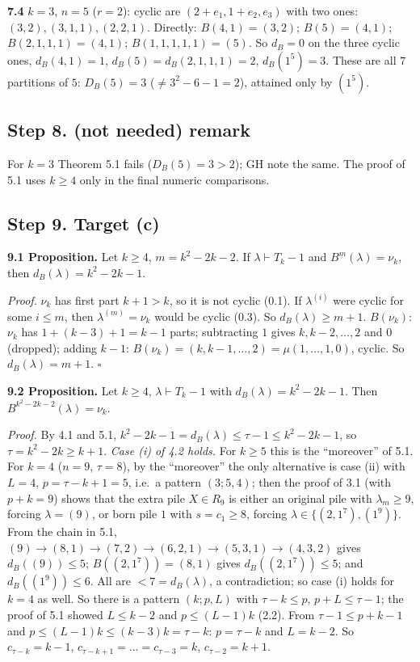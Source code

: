 \documentclass[11pt]{article}
\begin{document}
\textbf{7.4} $k=3$, $n=5$ ($r=2$): cyclic are $(2+e_1,1+e_2,e_3)$ with two ones: $(3,2),(3,1,1),(2,2,1)$. Directly: $B(4,1)=(3,2)$; $B(5)=(4,1)$; $B(2,1,1,1)=(4,1)$; $B(1,1,1,1,1)=(5)$. So $d_B=0$ on the three cyclic ones, $d_B(4,1)=1$, $d_B(5)=d_B(2,1,1,1)=2$, $d_B(1^5)=3$. These are all $7$ partitions of $5$: $D_B(5)=3$ ($\ne 3^2-6-1=2$), attained only by $(1^5)$.

\subsection*{Step 8. (not needed) remark}
For $k=3$ Theorem 5.1 fails ($D_B(5)=3>2$); GH note the same. The proof of 5.1 uses $k\ge4$ only in the final numeric comparisons.

\subsection*{Step 9. Target (c)}

\textbf{9.1 Proposition.} Let $k\ge4$, $m=k^2-2k-2$. If $\lambda\vdash T_k-1$ and $B^m(\lambda)=\nu_k$, then $d_B(\lambda)=k^2-2k-1$.

\emph{Proof.} $\nu_k$ has first part $k+1>k$, so it is not cyclic (0.1). If $\lambda^{(i)}$ were cyclic for some $i\le m$, then $\lambda^{(m)}=\nu_k$ would be cyclic (0.3). So $d_B(\lambda)\ge m+1$. $B(\nu_k)$: $\nu_k$ has $1+(k-3)+1=k-1$ parts; subtracting $1$ gives $k,k-2,\dots,2$ and $0$ (dropped); adding $k-1$: $B(\nu_k)=(k,k-1,\dots,2)=\mu(1,\dots,1,0)$, cyclic. So $d_B(\lambda)=m+1$. $\square$

\textbf{9.2 Proposition.} Let $k\ge4$, $\lambda\vdash T_k-1$ with $d_B(\lambda)=k^2-2k-1$. Then $B^{k^2-2k-2}(\lambda)=\nu_k$.

\emph{Proof.} By 4.1 and 5.1, $k^2-2k-1=d_B(\lambda)\le\tau-1\le k^2-2k-1$, so $\tau=k^2-2k\ge k+1$. \emph{Case (i) of 4.2 holds.} For $k\ge5$ this is the ``moreover'' of 5.1. For $k=4$ ($n=9$, $\tau=8$), by the ``moreover'' the only alternative is case (ii) with $L=4$, $p=\tau-k+1=5$, i.e.\ a pattern $(3;5,4)$; then the proof of 3.1 (with $p+k=9$) shows that the extra pile $X\in R_9$ is either an original pile with $\lambda_m\ge9$, forcing $\lambda=(9)$, or born pile $1$ with $s=c_1\ge8$, forcing $\lambda\in\{(2,1^7),(1^9)\}$. From the chain in 5.1, $(9)\to(8,1)\to(7,2)\to(6,2,1)\to(5,3,1)\to(4,3,2)$ gives $d_B((9))\le5$; $B((2,1^7))=(8,1)$ gives $d_B((2,1^7))\le5$; and $d_B((1^9))\le6$. All are $<7=d_B(\lambda)$, a contradiction; so case (i) holds for $k=4$ as well. So there is a pattern $(k;p,L)$ with $\tau-k\le p$, $p+L\le\tau-1$; the proof of 5.1 showed $L\le k-2$ and $p\le(L-1)k$ (2.2). From $\tau-1\le p+k-1$ and $p\le(L-1)k\le(k-3)k=\tau-k$: $p=\tau-k$ and $L=k-2$. So $c_{\tau-k}=k-1$, $c_{\tau-k+1}=\dots=c_{\tau-3}=k$, $c_{\tau-2}=k+1$.
\end{document}
